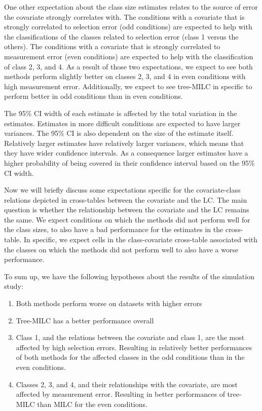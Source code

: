 \documentclass[a4paper, 11pt]{article} %
\begin{document}
One other expectation about the class size estimates relates to the source of error the covariate strongly correlates with. The conditions with a covariate that is strongly correlated to selection error (odd conditions) are expected to help with the classifications of the classes related to selection error (class 1 versus the others). The conditions with a covariate that is strongly correlated to measurement error (even conditions) are expected to help with the classification of class 2, 3, and 4. As a result of those two expectations, we expect to see both methods perform slightly better on classes 2, 3, and 4 in even conditions with high measurement error. Additionally, we expect to see tree-MILC in specific to perform better in odd conditions than in even conditions. 

The 95\% CI width of each estimate is affected by the total variation in the estimates. Estimates in more difficult conditions are expected to have larger variances. The 95\% CI is also dependent on the size of the estimate itself. Relatively larger estimates have relatively larger variances, which means that they have wider confidence intervals. As a consequence larger estimates have a higher probability of being covered in their confidence interval based on the 95\% CI width. 

Now we will briefly discuss some expectations specific for the covariate-class relations depicted in cross-tables between the covariate and the LC. The main question is whether the relationship between the covariate and the LC remains the same. We expect conditions on which the methods did not perform well for the class sizes, to also have a bad performance for the estimates in the cross-table. In specific, we expect cells in the class-covariate cross-table associated with the classes on which the methods did not perform well to also have a worse performance.



To sum up, we have the following hypotheses about the results of the simulation study: 
\begin{enumerate}
    \item Both methods perform worse on datasets with higher errors 
    \item Tree-MILC has a better performance overall
    \item Class 1, and the relations between the covariate and class 1, are the most affected by high selection errors. Resulting in relatively better performances of both methods for the affected classes in the odd conditions than in the even conditions.
    \item Classes 2, 3, and 4, and their relationships with the covariate, are most affected by measurement error. Resulting in better performances of tree-MILC than MILC for the even conditions.
\end{enumerate}
\end{document}
